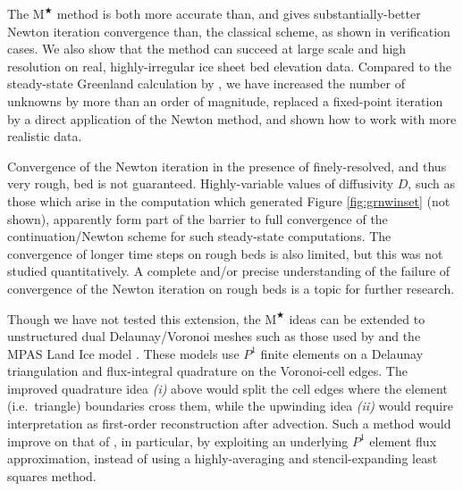 \documentclass[review,letterpaper]{igs}
\newcommand{\Mstar}{$\text{M}^{\bigstar}$\xspace}
\begin{document}
The \Mstar method is both more accurate than, and gives substantially-better Newton iteration convergence than, the classical scheme, as shown in verification cases.  We also show that the method can succeed at large scale and high resolution on real, highly-irregular ice sheet bed elevation data.  Compared to the steady-state Greenland calculation by \cite{JouvetBueler2012}, we have increased the number of unknowns by more than an order of magnitude, replaced a fixed-point iteration by a direct application of the Newton method, and shown how to work with more realistic data.

Convergence of the Newton iteration in the presence of finely-resolved, and thus very rough, bed is not guaranteed.  Highly-variable values of diffusivity $D$, such as those which arise in the computation which generated Figure \ref{fig:grnwinset} (not shown), apparently form part of the barrier to full convergence of the continuation/Newton scheme for such steady-state computations.  The convergence of longer time steps on rough beds is also limited, but this was not studied quantitatively.  A complete and/or precise understanding of the failure of convergence of the Newton iteration on rough beds is a topic for further research.

Though we have not tested this extension, the \Mstar ideas can be extended to unstructured dual Delaunay/Voronoi meshes such as those used by \cite{EgholmNielsen2010} and the MPAS Land Ice model \citep{MPASLandIce2013,Ringleretal2013}.  These models use $P^1$ finite elements on a Delaunay triangulation and flux-integral quadrature on the Voronoi-cell edges.  The improved quadrature idea \emph{(i)} above would split the cell edges where the element (i.e.~triangle) boundaries cross them, while the upwinding idea \emph{(ii)} would require interpretation as first-order reconstruction after advection.  Such a method would improve on that of \cite{EgholmNielsen2010}, in particular, by exploiting an underlying $P^1$ element flux approximation, instead of using a highly-averaging and stencil-expanding least squares method.
\end{document}
